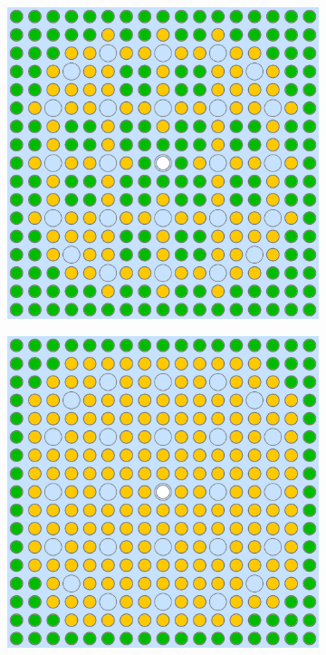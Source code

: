 \begin{figure}[h!]
\centering
\begin{subfigure}{0.48\textwidth}
  \centering
  \includegraphics[width=0.9\linewidth]{figures/unsupervised/geometries/with-features/2-clusters/pinch/assm-16}
  \caption{}
  \label{fig:chap10-assm-16-pinch-2}
\end{subfigure}%
\begin{subfigure}{0.48\textwidth}
  \centering
  \includegraphics[width=0.9\linewidth]{figures/unsupervised/geometries/with-features/2-clusters/combined/assm-16}

\end{subfigure}
\end{figure}
